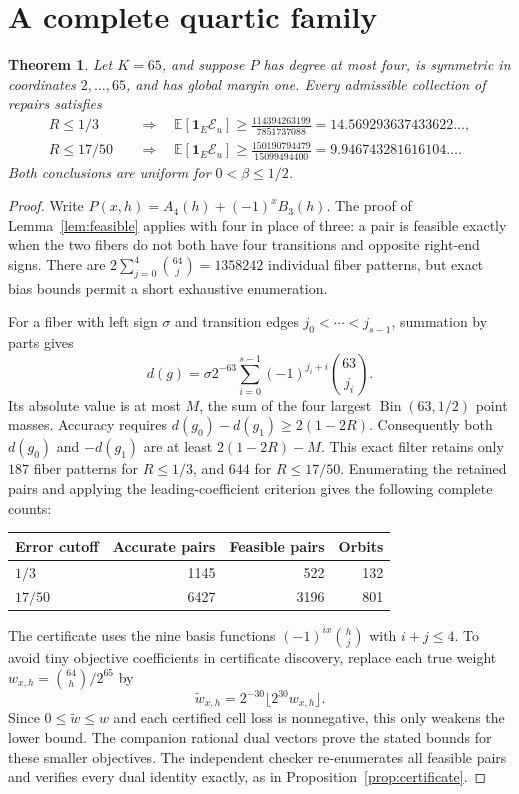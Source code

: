 \documentclass[11pt]{article}
\newtheorem{theorem}{Theorem}
\newcommand{\E}{\mathbb E}
\newcommand{\cost}{\mathcal E}
\begin{document}
\section{A complete quartic family}
\begin{theorem}\label{thm:quartic}
Let $K=65$, and suppose $P$ has degree at most four, is symmetric in coordinates $2,\ldots,65$, and has global margin one. Every admissible collection of repairs satisfies
\begin{align*}
 R\le1/3\quad&\Longrightarrow\quad
 \E[\mathbf1_E\cost_u]\ge\frac{114394263199}{7851737088}
 =14.569293637433622\ldots,\\
 R\le17/50\quad&\Longrightarrow\quad
 \E[\mathbf1_E\cost_u]\ge\frac{150190794479}{15099494400}
 =9.946743281616104\ldots.
\end{align*}
Both conclusions are uniform for $0<\beta\le1/2$.
\end{theorem}
\begin{proof}
Write $P(x,h)=A_4(h)+(-1)^xB_3(h)$. The proof of Lemma~\ref{lem:feasible} applies with four in place of three: a pair is feasible exactly when the two fibers do not both have four transitions and opposite right-end signs. There are $2\sum_{j=0}^4\binom{64}{j}=1358242$ individual fiber patterns, but exact bias bounds permit a short exhaustive enumeration.

For a fiber with left sign $\sigma$ and transition edges $j_0<\cdots<j_{s-1}$, summation by parts gives
\[
 d(g)=\sigma2^{-63}\sum_{i=0}^{s-1}(-1)^{j_i+i}\binom{63}{j_i}.
\]
Its absolute value is at most $M$, the sum of the four largest $\operatorname{Bin}(63,1/2)$ point masses. Accuracy requires $d(g_0)-d(g_1)\ge2(1-2R)$. Consequently both $d(g_0)$ and $-d(g_1)$ are at least $2(1-2R)-M$. This exact filter retains only $187$ fiber patterns for $R\le1/3$, and $644$ for $R\le17/50$. Enumerating the retained pairs and applying the leading-coefficient criterion gives the following complete counts:
\begin{center}
\begin{tabular}{lrrr}\toprule
Error cutoff & Accurate pairs & Feasible pairs & Orbits\\\midrule
$1/3$ &1145&522&132\\
$17/50$ &6427&3196&801\\\bottomrule
\end{tabular}
\end{center}

The certificate uses the nine basis functions $(-1)^{ix}\binom hj$ with $i+j\le4$. To avoid tiny objective coefficients in certificate discovery, replace each true weight $w_{x,h}=\binom{64}{h}/2^{65}$ by
\[
 \widetilde w_{x,h}=2^{-30}\lfloor2^{30}w_{x,h}\rfloor.
\]
Since $0\le\widetilde w\le w$ and each certified cell loss is nonnegative, this only weakens the lower bound. The companion rational dual vectors prove the stated bounds for these smaller objectives. The independent checker re-enumerates all feasible pairs and verifies every dual identity exactly, as in Proposition~\ref{prop:certificate}.
\end{proof}
\end{document}

